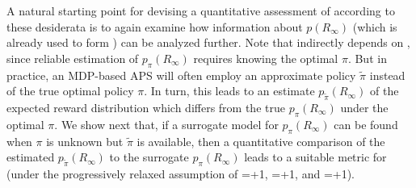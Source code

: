     
 A natural starting point for devising a quantitative assessment of \xQ{} according to these desiderata is to again examine how information about $p(R_{\infty})$ (which is already used to form \xO{}) can be analyzed further. 
 Note that \xO{} indirectly depends on \xQ{}, since reliable estimation of $p_{\pi}(R_{\infty})$ requires knowing the optimal $\pi$. But in practice, an MDP-based APS will often employ an approximate policy $\tilde{\pi}$ instead of the true optimal policy $\pi$. In turn, this leads to an estimate $p_{\tilde{\pi}}(R_{\infty})$ of the expected reward distribution which differs from the true $p_{\pi}(R_{\infty})$ under the optimal $\pi$. We show next that, if a surrogate model for $p_{\pi}(R_{\infty})$ can be found when $\pi$ is unknown but $\tilde{\pi}$ is available, then a quantitative comparison of the estimated $p_{\tilde{\pi}}(R_{\infty})$ to the surrogate $p_{\pi}(R_{\infty})$ leads to a suitable metric for \xQ{} (under the progressively relaxed assumption of \xM{}=+1, \xP{}=+1, and \xI{}=+1). 
    
    
